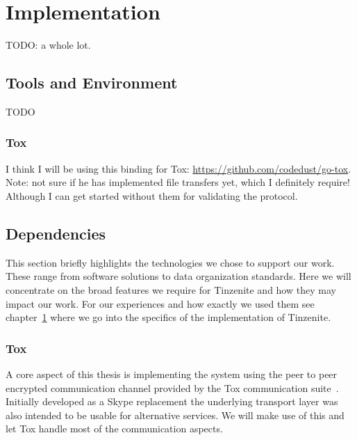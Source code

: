 \chapter{Implementation}
\label{chap:implementation}

TODO: a whole lot.

\section{Tools and Environment}

TODO

\subsection{Tox}
\label{sub:Tox}

I think I will be using this binding for Tox: \url{https://github.com/codedust/go-tox}.
Note: not sure if he has implemented file transfers yet, which I definitely require!
Although I can get started without them for validating the protocol.

\section{Dependencies}
\label{sec:Dependencies}

This section briefly highlights the technologies we chose to support our work.
These range from software solutions to data organization standards.
Here we will concentrate on the broad features we require for Tinzenite and how they may impact our work.
For our experiences and how exactly we used them see chapter~\ref{chap:implementation} where we go into the specifics of the implementation of Tinzenite.

\subsection{Tox}

A core aspect of this thesis is implementing the system using the peer to peer encrypted communication channel provided by the Tox communication suite~\cite{web:site:tox}.
Initially developed as a Skype replacement the underlying transport layer was also intended to be usable for alternative services.
We will make use of this and let Tox handle most of the communication aspects.

